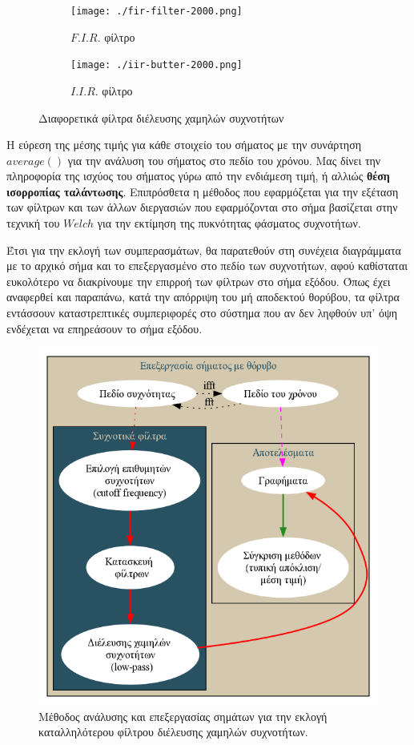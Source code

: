 \documentclass[breaklines=true, 12pt]{article}
\begin{document}
{{{\begin{figure}
\centering
\begin{subfigure}{.5\textwidth}
\centering
\texttt{[image: ./fir-filter-2000.png]}
\caption{\(F.I.R.\) φίλτρο}
\label{fig:sub1}
\end{subfigure}%
\begin{subfigure}{.5\textwidth}
\centering
\texttt{[image: ./iir-butter-2000.png]}
\caption{\(I.I.R.\) φίλτρο}
\label{fig:sub2}
\end{subfigure}
\caption{Διαφορετικά φίλτρα διέλευσης χαμηλών συχνοτήτων}
\label{fig:test}
\end{figure}

Η εύρεση της μέσης τιμής για κάθε στοιχείο του σήματος με την συνάρτηση
\(average()\) για την ανάλυση του σήματος στο πεδίο του
χρόνου. Μας δίνει την πληροφορία της ισχύος του σήματος γύρω από την ενδιάμεση
τιμή, ή αλλιώς \textbf{θέση ισορροπίας ταλάντωσης}. Επιπρόσθετα η μέθοδος που
εφαρμόζεται για την εξέταση των φίλτρων και των άλλων διεργασιών που
εφαρμόζονται στο σήμα βασίζεται στην τεχνική του \(Welch\) για την εκτίμηση της
πυκνότητας φάσματος συχνοτήτων.

Έτσι για την εκλογή των συμπερασμάτων, θα παρατεθούν στη συνέχεια διαγράμματα
με το αρχικό σήμα και το επεξεργασμένο στο πεδίο των συχνοτήτων, αφού καθίσταται
ευκολότερο να διακρίνουμε την επιρροή των φίλτρων στο σήμα εξόδου. Όπως έχει
αναφερθεί και παραπάνω, κατά την απόρριψη του μή αποδεκτού θορύβου, τα φίλτρα
εντάσσουν καταστρεπτικές συμπεριφορές στο σύστημα που αν δεν ληφθούν
υπ' όψη ενδέχεται να επηρεάσουν το σήμα εξόδου.

\begin{figure}[htbp]
\centering
\includegraphics[width=.9\linewidth]{./flowcharts/proc-meth.png}
\caption{Μέθοδος ανάλυσης και επεξεργασίας σημάτων για την εκλογή καταλληλότερου φίλτρου διέλευσης χαμηλών συχνοτήτων.}
\end{figure}

}}}
\end{document}
